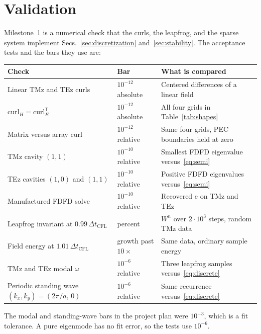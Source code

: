 \documentclass[11pt,a4paper]{article}
\numberwithin{equation}{section}
\begin{document}
\section{Validation}
\label{sec:validation}

Milestone~1 is a numerical check that the curls, the leapfrog, and the sparse
system implement Secs.~\ref{sec:discretization} and~\ref{sec:stability}. The
acceptance tests and the bars they use are:

\begin{center}
\small
\begin{tabular}{@{}>{\raggedright\arraybackslash}p{5.0cm}>{\raggedright\arraybackslash}p{3.5cm}>{\raggedright\arraybackslash}p{6.2cm}@{}}
\toprule
Check & Bar & What is compared\\
\midrule
Linear TMz and TEz curls & $10^{-12}$ absolute & Centered differences of a linear field\\
$\mathrm{curl}_H=\mathrm{curl}_E^{\mathsf T}$ & $10^{-12}$ absolute & All four grids in Table~\ref{tab:shapes}\\
Matrix versus array curl & $10^{-12}$ relative & Same four grids, PEC boundaries held at zero\\
TMz cavity $(1,1)$ & $10^{-10}$ relative & Smallest FDFD eigenvalue versus~\eqref{eq:semi}\\
TEz cavities $(1,0)$ and $(1,1)$ & $10^{-10}$ relative & Positive FDFD eigenvalues versus~\eqref{eq:semi}\\
Manufactured FDFD solve & $10^{-10}$ relative & Recovered $\mathrm{e}$ on TMz and TEz\\
Leapfrog invariant at $0.99\,\Delta t_{\mathrm{CFL}}$ & 1 percent & $W^n$ over $2\cdot 10^3$ steps, random TMz data\\
Field energy at $1.01\,\Delta t_{\mathrm{CFL}}$ & growth past $10\times$ & Same data, ordinary sample energy\\
TMz and TEz modal $\omega$ & $10^{-6}$ relative & Three leapfrog samples versus~\eqref{eq:discrete}\\
Periodic standing wave $(k_x,k_y)=(2\pi/a,\,0)$ & $10^{-6}$ relative & Same recurrence versus~\eqref{eq:discrete}\\
\bottomrule
\end{tabular}
\end{center}

The modal and standing-wave bars in the project plan were $10^{-3}$, which is
a fit tolerance. A pure eigenmode has no fit error, so the tests use
$10^{-6}$.
\end{document}
